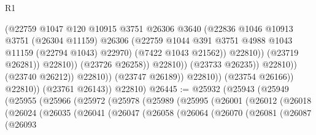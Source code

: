\begin{lexlean}{R1}
\begin{coremodule}
                                              (@22759
                                                @1047
                                                @120
                                                @10915
                                                @3751
                                                @26306
                                                @3640
                                                (@22836
                                                  @1046
                                                  @10913
                                                  @3751
                                                  (@26304 @11159)
                                                  @26306
                                                  (@22759
                                                    @1044
                                                    @391
                                                    @3751
                                                    @4988
                                                    @1043
                                                    @11159
                                                    (@22794 @1043)
                                                    @22970)
                                                  (@7422 @1043 @21562))
                                                @22810))
                                            (@23719 @26281))
                                          @22810))
                                      (@23726 @26258))
                                    @22810))
                                (@23733 @26235))
                              @22810))
                          (@23740 @26212))
                        @22810))
                    (@23747 @26189))
                  @22810))
              (@23754 @26166))
            @22810))
        (@23761 @26143))
      @22810)
@26445 := @25932
    (@25943
      (@25949
        (@25955
          (@25966
            (@25972
              (@25978
                (@25989
                  (@25995
                    (@26001
                      (@26012
                        (@26018
                          (@26024
                            (@26035
                              (@26041
                                (@26047
                                  (@26058
                                    (@26064
                                      (@26070
                                        (@26081
                                          (@26087
                                            (@26093

\end{coremodule}
\end{lexlean}
